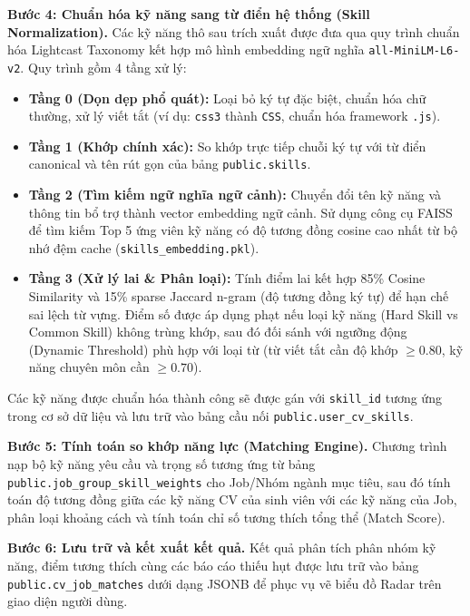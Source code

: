 \textbf{Bước 4: Chuẩn hóa kỹ năng sang từ điển hệ thống (Skill Normalization).}
Các kỹ năng thô sau trích xuất được đưa qua quy trình chuẩn hóa Lightcast Taxonomy kết hợp mô hình embedding ngữ nghĩa \texttt{all-MiniLM-L6-v2}. Quy trình gồm 4 tầng xử lý:

\begin{itemize}
    \item \textbf{Tầng 0 (Dọn dẹp phổ quát):} Loại bỏ ký tự đặc biệt, chuẩn hóa chữ thường, xử lý viết tắt (ví dụ: \texttt{css3} thành \texttt{CSS}, chuẩn hóa framework \texttt{.js}).
    \item \textbf{Tầng 1 (Khớp chính xác):} So khớp trực tiếp chuỗi ký tự với từ điển canonical và tên rút gọn của bảng \texttt{public.skills}.
    \item \textbf{Tầng 2 (Tìm kiếm ngữ nghĩa ngữ cảnh):} Chuyển đổi tên kỹ năng và thông tin bổ trợ thành vector embedding ngữ cảnh. Sử dụng công cụ FAISS để tìm kiếm Top 5 ứng viên kỹ năng có độ tương đồng cosine cao nhất từ bộ nhớ đệm cache (\texttt{skills\_embedding.pkl}).
    \item \textbf{Tầng 3 (Xử lý lai \& Phân loại):} Tính điểm lai kết hợp 85\% Cosine Similarity và 15\% sparse Jaccard n-gram (độ tương đồng ký tự) để hạn chế sai lệch từ vựng. Điểm số được áp dụng phạt nếu loại kỹ năng (Hard Skill vs Common Skill) không trùng khớp, sau đó đối sánh với ngưỡng động (Dynamic Threshold) phù hợp với loại từ (từ viết tắt cần độ khớp $\geq 0.80$, kỹ năng chuyên môn cần $\geq 0.70$).
\end{itemize}

Các kỹ năng được chuẩn hóa thành công sẽ được gán với \texttt{skill\_id} tương ứng trong cơ sở dữ liệu và lưu trữ vào bảng cầu nối \texttt{public.user\_cv\_skills}.

\textbf{Bước 5: Tính toán so khớp năng lực (Matching Engine).}
Chương trình nạp bộ kỹ năng yêu cầu và trọng số tương ứng từ bảng \texttt{public.job\_group\_skill\_weights} cho Job/Nhóm ngành mục tiêu, sau đó tính toán độ tương đồng giữa các kỹ năng CV của sinh viên với các kỹ năng của Job, phân loại khoảng cách và tính toán chỉ số tương thích tổng thể (Match Score).

\textbf{Bước 6: Lưu trữ và kết xuất kết quả.}
Kết quả phân tích phân nhóm kỹ năng, điểm tương thích cùng các báo cáo thiếu hụt được lưu trữ vào bảng \texttt{public.cv\_job\_matches} dưới dạng JSONB để phục vụ vẽ biểu đồ Radar trên giao diện người dùng.

